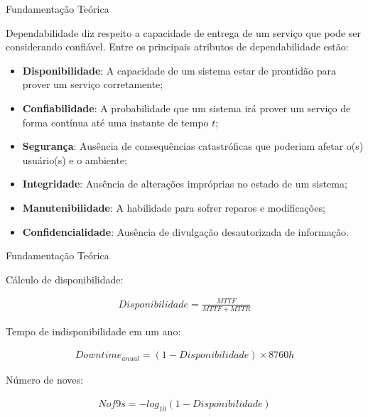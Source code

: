\documentclass{beamer}
\begin{document}
    \begin{frame}{Fundamentação Teórica}
    
        Dependabilidade diz respeito a capacidade de entrega de um serviço que pode ser considerando confiável. Entre os principais atributos de dependabilidade estão:
        
        \begin{itemize}
            \item \textbf{Disponibilidade}: A capacidade de um sistema estar de prontidão para prover um serviço corretamente;
            \item \textbf{Confiabilidade}: A probabilidade que um sistema irá prover um serviço de forma contínua até uma instante de tempo $t$; 
            \item \textbf{Segurança}: Ausência de consequências catastróficas que poderiam afetar o(s) usuário(s) e o ambiente;
            \item \textbf{Integridade}: Ausência de alterações impróprias no estado de um sistema;
            \item \textbf{Manutenibilidade}: A habilidade para sofrer reparos e modificações;
            \item \textbf{Confidencialidade}: Ausência de divulgação desautorizada de informação.
        \end{itemize}

    \end{frame}
    
    \begin{frame}{Fundamentação Teórica}
    
        Cálculo de disponibilidade:
        
        \begin{align*}
   			Disponibilidade = \frac{MTTF}{MTTF + MTTR}
   		\end{align*}
    
        Tempo de indisponibilidade em um ano:
        
        \begin{align*}
   			Downtime_{anual} = (1 - Disponibilidade) \times 8760h
   		\end{align*}
   		
   		Número de noves:
   		
   		\begin{align*}
   			Nof9s = - log_{10}(1 - Disponibilidade)
   		\end{align*}
        
    \end{frame}
\end{document}
